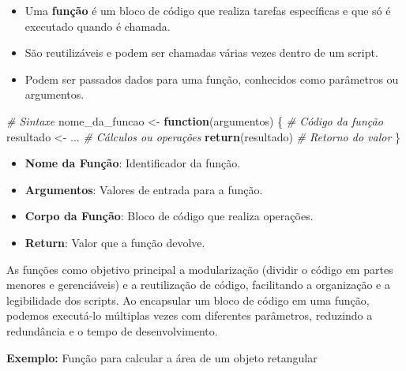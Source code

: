 \documentclass[
]{book}
\newenvironment{Shaded}{\begin{snugshade}}{\end{snugshade}}
\newcommand{\CommentTok}[1]{\textcolor[rgb]{0.56,0.35,0.01}{\textit{#1}}}
\newcommand{\ControlFlowTok}[1]{\textcolor[rgb]{0.13,0.29,0.53}{\textbf{#1}}}
\newcommand{\FunctionTok}[1]{\textcolor[rgb]{0.13,0.29,0.53}{\textbf{#1}}}
\newcommand{\NormalTok}[1]{#1}
\newcommand{\OtherTok}[1]{\textcolor[rgb]{0.56,0.35,0.01}{#1}}
\theoremstyle{definition}
\theoremstyle{definition}
\theoremstyle{definition}
\theoremstyle{definition}
\theoremstyle{remark}
\begin{document}
\begin{itemize}
\item
  Uma \textbf{função} é um bloco de código que realiza tarefas específicas e que só é executado quando é chamada.
\item
  São reutilizáveis e podem ser chamadas várias vezes dentro de um script.
\item
  Podem ser passados dados para uma função, conhecidos como parâmetros ou argumentos.
\end{itemize}

\begin{Shaded}
\begin{Highlighting}[]
\CommentTok{\# Sintaxe}
\NormalTok{nome\_da\_funcao }\OtherTok{\textless{}{-}} \ControlFlowTok{function}\NormalTok{(argumentos) \{}
  \CommentTok{\# Código da função}
\NormalTok{  resultado }\OtherTok{\textless{}{-}}\NormalTok{ ... }\CommentTok{\# Cálculos ou operações}
  \FunctionTok{return}\NormalTok{(resultado) }\CommentTok{\# Retorno do valor}
\NormalTok{\}}
\end{Highlighting}
\end{Shaded}

\begin{itemize}
\item
  \textbf{Nome da Função}: Identificador da função.
\item
  \textbf{Argumentos}: Valores de entrada para a função.
\item
  \textbf{Corpo da Função}: Bloco de código que realiza operações.
\item
  \textbf{Return}: Valor que a função devolve.
\end{itemize}

As funções como objetivo principal a modularização (dividir o código em partes menores e gerenciáveis) e a reutilização de código, facilitando a organização e a legibilidade dos scripts. Ao encapsular um bloco de código em uma função, podemos executá-lo múltiplas vezes com diferentes parâmetros, reduzindo a redundância e o tempo de desenvolvimento.

\textbf{Exemplo:} Função para calcular a área de um objeto retangular
\end{document}
